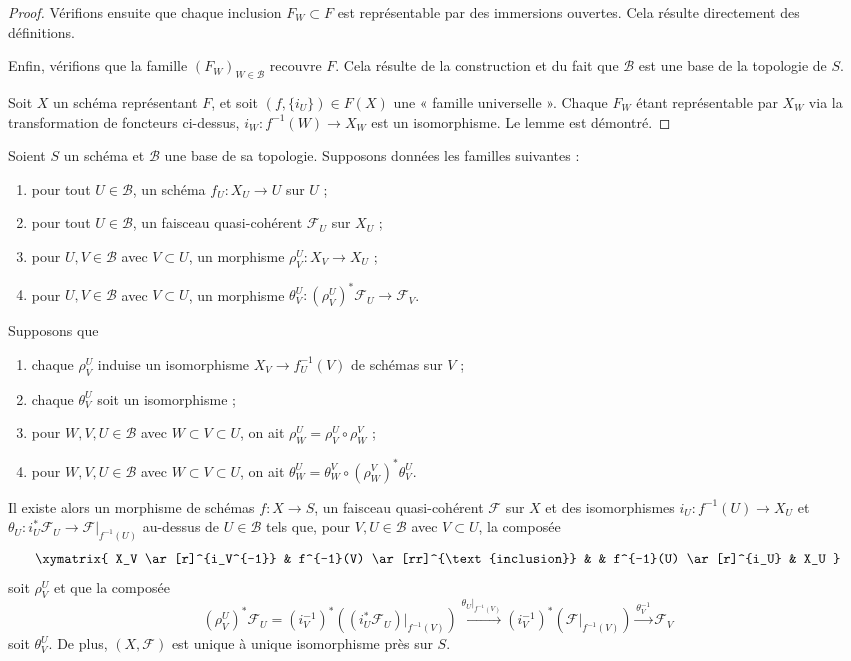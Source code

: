 \begin{proof}
\medskip\noindent
Vérifions ensuite que chaque inclusion $F_W \subset F$ est représentable
par des immersions ouvertes. Cela résulte directement des définitions.

\medskip\noindent
Enfin, vérifions que la famille $(F_W)_{W \in \mathcal{B}}$ recouvre $F$.
Cela résulte de la construction et du fait que $\mathcal{B}$ est une base
de la topologie de $S$.

\medskip\noindent
Soit $X$ un schéma représentant $F$, et soit
$(f, \{i_U\}) \in F(X)$ une « famille universelle ».
Chaque $F_W$ étant représentable par $X_W$ via la transformation de
foncteurs ci-dessus, $i_W : f^{-1}(W) \to X_W$ est un isomorphisme.
Le lemme est démontré.
\end{proof}

\begin{lemma}
\label{lemma-relative-glueing-sheaves}
Soient $S$ un schéma et $\mathcal{B}$ une base de sa topologie.
Supposons données les familles suivantes :
\begin{enumerate}
\item pour tout $U \in \mathcal{B}$, un schéma $f_U : X_U \to U$ sur $U$ ;
\item pour tout $U \in \mathcal{B}$, un faisceau quasi-cohérent
$\mathcal{F}_U$ sur $X_U$ ;
\item pour $U, V \in \mathcal{B}$ avec $V \subset U$, un morphisme
$\rho^U_V : X_V \to X_U$ ;
\item pour $U, V \in \mathcal{B}$ avec $V \subset U$, un morphisme
$\theta^U_V : (\rho^U_V)^*\mathcal{F}_U \to \mathcal{F}_V$.
\end{enumerate}
Supposons que
\begin{enumerate}
\item[(a)] chaque $\rho^U_V$ induise un isomorphisme
$X_V \to f_U^{-1}(V)$ de schémas sur $V$ ;
\item[(b)] chaque $\theta^U_V$ soit un isomorphisme ;
\item[(c)] pour $W, V, U \in \mathcal{B}$ avec $W \subset V \subset U$,
on ait $\rho^U_W = \rho^U_V \circ \rho ^V_W$ ;
\item[(d)] pour $W, V, U \in \mathcal{B}$ avec $W \subset V \subset U$,
on ait $\theta^U_W = \theta^V_W \circ (\rho^V_W)^*\theta^U_V$.
\end{enumerate}
Il existe alors un morphisme de schémas $f : X \to S$, un faisceau
quasi-cohérent $\mathcal{F}$ sur $X$ et des isomorphismes
$i_U : f^{-1}(U) \to X_U$ et
$\theta_U : i_U^*\mathcal{F}_U \to \mathcal{F}|_{f^{-1}(U)}$
au-dessus de $U \in \mathcal{B}$ tels que, pour $V, U \in \mathcal{B}$
avec $V \subset U$, la composée
$$
\xymatrix{
X_V \ar[r]^{i_V^{-1}} &
f^{-1}(V) \ar[rr]^{\text{inclusion}} & &
f^{-1}(U) \ar[r]^{i_U} &
X_U
}
$$
soit $\rho^U_V$ et que la composée
\begin{equation}
\label{equation-glue}
(\rho^U_V)^*\mathcal{F}_U
=
(i_V^{-1})^*((i_U^*\mathcal{F}_U)|_{f^{-1}(V)})
\xrightarrow{\theta_U|_{f^{-1}(V)}}
(i_V^{-1})^*(\mathcal{F}|_{f^{-1}(V)})
\xrightarrow{\theta_V^{-1}}
\mathcal{F}_V
\end{equation}
soit $\theta^U_V$. De plus, $(X, \mathcal{F})$ est unique à unique
isomorphisme près sur $S$.
\end{lemma}

